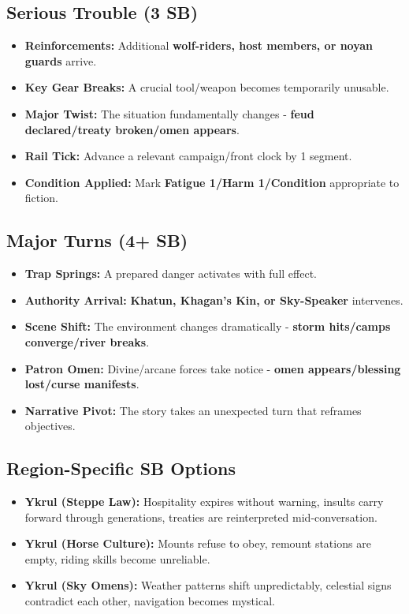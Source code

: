 \subsection*{Serious Trouble (3 SB)}
\begin{itemize}
\item \textbf{Reinforcements:} Additional \textbf{wolf-riders, host members, or noyan guards} arrive.
\item \textbf{Key Gear Breaks:} A crucial tool/weapon becomes temporarily unusable.
\item \textbf{Major Twist:} The situation fundamentally changes - \textbf{feud declared/treaty broken/omen appears}.
\item \textbf{Rail Tick:} Advance a relevant campaign/front clock by 1 segment.
\item \textbf{Condition Applied:} Mark \textbf{Fatigue 1/Harm 1/Condition} appropriate to fiction.
\end{itemize}

\subsection*{Major Turns (4+ SB)}
\begin{itemize}
\item \textbf{Trap Springs:} A prepared danger activates with full effect.
\item \textbf{Authority Arrival:} \textbf{Khatun, Khagan's Kin, or Sky-Speaker} intervenes.
\item \textbf{Scene Shift:} The environment changes dramatically - \textbf{storm hits/camps converge/river breaks}.
\item \textbf{Patron Omen:} Divine/arcane forces take notice - \textbf{omen appears/blessing lost/curse manifests}.
\item \textbf{Narrative Pivot:} The story takes an unexpected turn that reframes objectives.
\end{itemize}

\subsection*{Region-Specific SB Options}
\begin{itemize}
\item \textbf{Ykrul (Steppe Law):} Hospitality expires without warning, insults carry forward through generations, treaties are reinterpreted mid-conversation.
\item \textbf{Ykrul (Horse Culture):} Mounts refuse to obey, remount stations are empty, riding skills become unreliable.
\item \textbf{Ykrul (Sky Omens):} Weather patterns shift unpredictably, celestial signs contradict each other, navigation becomes mystical.
\end{itemize}
